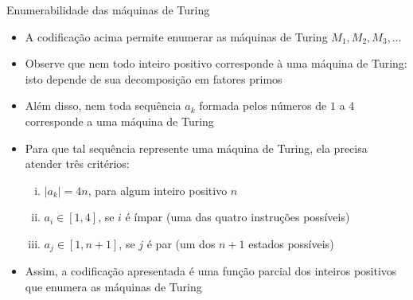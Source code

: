 \begin{frame}[fragile]{Enumerabilidade das máquinas de Turing}

    \begin{itemize}
        \item A codificação acima permite enumerar as máquinas de Turing $M_1, M_2, M_3, \ldots$

        \item Observe que nem todo inteiro positivo corresponde à uma máquina de Turing: isto
            depende de sua decomposição em fatores primos

        \item Além disso, nem toda sequência $a_k$ formada pelos números de $1$ 
            a $4$ corresponde a uma máquina de Turing

        \item Para que tal sequência represente uma máquina de Turing, ela precisa atender três
            critérios:
            \begin{enumerate}[i.]
                \item $|a_k| = 4n$, para algum inteiro positivo $n$
                \item $a_i\in [1,4]$, se $i$ é ímpar (uma das quatro instruções possíveis)
                \item $a_j\in [1,n + 1]$, se $j$ é par (um dos $n+1$ estados possíveis)
            \end{enumerate}
            
        \item Assim, a codificação apresentada é uma função parcial dos inteiros positivos que
            enumera as máquinas de Turing
    \end{itemize}

\end{frame}

